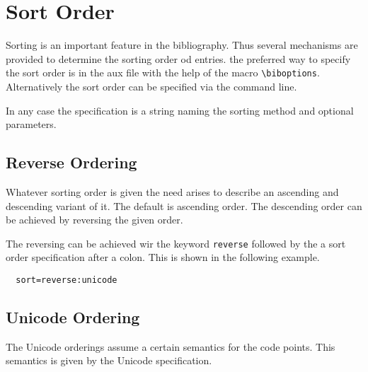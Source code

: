 
\chapter{Sort Order}%
\label{sec:sort.order}

Sorting is an important feature in the bibliography. Thus several
mechanisms are provided to determine the sorting order od entries.
the preferred way to specify the sort order is in the aux file with
the help of the macro \verb|\biboptions|. Alternatively the sort order
can be specified via the command line.

In any case the specification is a string naming the sorting method
and optional parameters.


\section{Reverse Ordering}

Whatever sorting order is given the need arises to describe an
ascending and descending variant of it. The default is ascending
order. The descending order can be achieved by reversing the given
order.

The reversing can be achieved wir the keyword \texttt{reverse}
followed by the a sort order specification after a colon. This is
shown in the following example.

\begin{verbatim}
  sort=reverse:unicode
\end{verbatim}

\section{Unicode Ordering}

The Unicode orderings assume a certain semantics for the code points.
This semantics is given by the Unicode specification.

